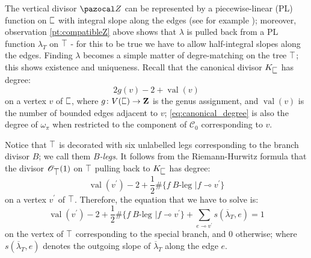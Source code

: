 \documentclass{compositio}
\newcommand{\tropC}{\scalebox{0.8}[1.3]{$\sqsubset$}}
\newcommand{\tropT}{\scalebox{0.9}[1.2]{$\top$}}
\newcommand{\OO}{\mathcal O}
\renewcommand{\to}{\rightarrow}
\theoremstyle{plain}
\theoremstyle{definition}
\theoremstyle{remark}
\begin{document}
 The vertical divisor $\pazocal Z$ can be represented by a piecewise-linear (PL) function on $\tropC$ with integral slope along the edges (see for example \cite{BakerNorine}); moreover, observation \ref{pt:compatibleZ} above shows that $\lambda$ is pulled back from a PL function $\lambda_T$ on $\tropT$ - for this to be true we have to allow half-integral slopes along the edges. Finding $\lambda$ becomes a simple matter of degre-matching on the tree $\tropT$; this shows existence and uniqueness. Recall that the canonical divisor $K_{\tropC}$ has degree:
 \begin{equation}\label{eq:canonical_degree}
 2g(v)-2+\operatorname{val}(v)                                                                                                                                                                                                                                                                                                                                                                                                                                                                                                                                                                                                                                                                                                                                                                                                                                                                                                                                                                                                                                                             \end{equation}
on a vertex $v$ of $\tropC$, where $g\colon V(\tropC)\to\mathbb Z$ is the genus assignment, and $\operatorname{val}(v)$ is the number of bounded edges adjacent to $v$; \eqref{eq:canonical_degree} is also the degree of $\omega_\pi$ when restricted to the component of $\mathcal C_0$ corresponding to $v$.

Notice that $\tropT$ is decorated with six unlabelled legs corresponding to the branch divisor $B$; we call them $B$\emph{-legs}. It follows from the Riemann-Hurwitz formula that the divisor $\OO_{\tropT}(1)$ on $\tropT$ pulling back to $K_{\tropC}$ has degree:
 \[ \operatorname{val}(v^\prime)-2+\frac{1}{2}\#\{f\ B\text{-leg }| f\multimap v^\prime\} \]
 on a vertex $v^\prime$ of $\tropT$. Therefore, the equation that we have to solve is:
 \begin{equation}\label{eqn:Dv}
  \operatorname{val}(v^\prime)-2+\frac{1}{2}\#\{f\ B\text{-leg }| f\multimap v^\prime\}+\sum_{e\multimap v^\prime}s(\overline\lambda_T,e)=1
 \end{equation}
 on the vertex of $\tropT$ corresponding to the special branch, and $0$ otherwise; where $s(\overline\lambda_T,e)$ denotes the outgoing slope of $\overline\lambda_T$ along the edge $e$.
\end{document}
